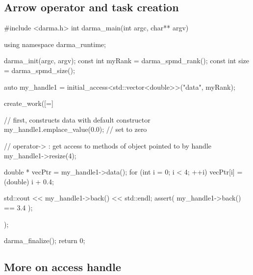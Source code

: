 \subsection{Arrow operator and task creation}

\begin{CppCodeNumb}
#include <darma.h>
int darma_main(int argc, char** argv)
{
  using namespace darma_runtime;

  darma_init(argc, argv);
  const int myRank = darma_spmd_rank();
  const int size = darma_spmd_size();

  auto my_handle1 = initial_access<std::vector<double>>("data", myRank);

  create_work([=]
  {
    // first, constructs data with default constructor
    my_handle1.emplace_value(0.0); // set to zero

    // operator-> : get access to methods of object pointed to by handle
    my_handle1->resize(4);

    double * vecPtr = my_handle1->data();
    for (int i = 0; i < 4; ++i)
    {
      vecPtr[i] = (double) i + 0.4;
    }

    std::cout << my_handle1->back() << std::endl;
    assert( my_handle1->back() == 3.4 );
  });

  darma_finalize();
  return 0;
}
\end{CppCodeNumb}




\subsection{More on access handle}

